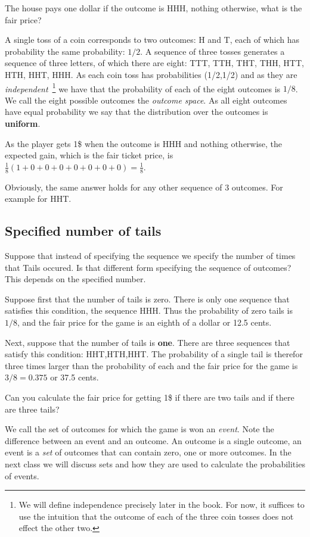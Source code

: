 The house pays one dollar if the outcome is HHH, nothing otherwise, what
is the fair price?

A single toss of a coin corresponds to two outcomes: H and T, each of
which has probability the same probability: $1/2$. A sequence of three
tosses generates a sequence of three letters, of which there are
eight: TTT, TTH, THT, THH, HTT, HTH, HHT, HHH. As each coin toss has
probabilities (1/2,1/2) and as they are {\em independent}~\footnote{We
  will define independence precisely later in the book. For now, it
  suffices to use the intuition that the outcome of each of the three
  coin tosses does not effect the other two.} we have that the
probability of each of the eight outcomes is $1/8$. We call the eight
possible outcomes the {\em outcome space}. As all eight outcomes have
equal probability we say that the distribution over the outcomes is
{\bf uniform}.

As the player gets 1\$ when the outcome is HHH and nothing otherwise,
the expected gain, which is the fair ticket price, is 
$\frac{1}{8}(1+0+0+0+0+0+0+0)=\frac{1}{8}$.

Obviously, the same answer holds for any other sequence of 3
outcomes. For example for HHT.

\subsection{Specified number of tails}

Suppose that instead of specifying the sequence we specify the number
of times that Tails occured. Is that different form specifying the
sequence of outcomes? This depends on the specified number.

Suppose first that the number of tails is zero. There is only one
sequence that satisfies this condition, the sequence HHH. Thus the
probability of zero tails is $1/8$, and the fair price for the game is
an eighth of a dollar or 12.5 cents.

Next, suppose that the number of tails is {\bf one}. There are three
sequences that satisfy this condition: HHT,HTH,HHT. The probability of
a single tail is therefor three times larger than the probability of
each and the fair price for the game is $3/8 = 0.375$ or 37.5 cents.

Can you calculate the fair price for getting 1\$ if there are two
tails and if there are three tails?

We call the set of outcomes for which the game is won an {\em
  event}. Note the difference between an event and an outcome. An
outcome is a single outcome, an event is a {\em set} of outcomes that
can contain zero, one or more outcomes. In the next class we will discuss
sets and how they are used to calculate the probabilities of events.

